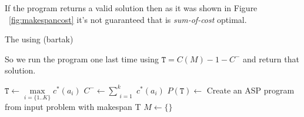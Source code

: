 If the program returns a valid solution then as it was shown in Figure ~\ref{fig:makespancost} it's not guaranteed that is \emph{sum-of-cost} optimal. 

The using (bartak)

So we run the program one last time using $\mathtt{T}=C(M) - 1 - C^-$ and return that solution.


\begin{algorithm}
\DontPrintSemicolon
{}
$\mathtt{T} \gets \max\limits_{i=\{1..K\} }{c^*(a_i)}$\;
$C^- \gets \sum_{\substack{i=1}}^{k} c^*(a_i)$\;
$P(\mathtt{T}) \gets$ Create an ASP program from input problem with makespan T\;
$M \gets \{\}$\;

\end{algorithm}

